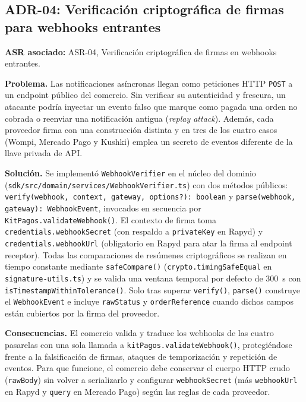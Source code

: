 \subsection{ADR-04: Verificación criptográfica de firmas para webhooks entrantes}
\textbf{ASR asociado:} ASR-04, Verificación criptográfica de firmas en webhooks entrantes.

\textbf{Problema.} Las notificaciones asíncronas llegan como peticiones HTTP \texttt{POST} a un endpoint público del comercio. Sin verificar su autenticidad y frescura, un atacante podría inyectar un evento falso que marque como pagada una orden no cobrada o reenviar una notificación antigua (\textit{replay attack}). Además, cada proveedor firma con una construcción distinta y en tres de los cuatro casos (Wompi, Mercado Pago y Kushki) emplea un secreto de eventos diferente de la llave privada de API.

\textbf{Solución.} Se implementó \texttt{Webhook\allowbreak{}Verifier} en el núcleo del dominio (\texttt{sdk/\allowbreak{}src/\allowbreak{}domain/\allowbreak{}services/\allowbreak{}Webhook\allowbreak{}Verifier.ts}) con dos métodos públicos: \texttt{verify(\allowbreak{}webhook, context, gateway, options?): boolean} y \texttt{parse(\allowbreak{}webhook, gateway): WebhookEvent}, invocados en secuencia por \texttt{KitPagos.\allowbreak{}validate\allowbreak{}Webhook()}. El contexto de firma toma \texttt{credentials.\allowbreak{}webhookSecret} (con respaldo a \texttt{privateKey} en Rapyd) y \texttt{credentials.\allowbreak{}webhookUrl} (obligatorio en Rapyd para atar la firma al endpoint receptor). Todas las comparaciones de resúmenes criptográficos se realizan en tiempo constante mediante \texttt{safeCompare()} (\texttt{crypto.\allowbreak{}timing\allowbreak{}Safe\allowbreak{}Equal} en \texttt{signature-\allowbreak{}utils.ts}) y se valida una ventana temporal por defecto de 300~s con \texttt{is\allowbreak{}Timestamp\allowbreak{}Within\allowbreak{}Tolerance()}. Solo tras superar \texttt{verify()}, \texttt{parse()} construye el \texttt{WebhookEvent} e incluye \texttt{rawStatus} y \texttt{orderReference} cuando dichos campos están cubiertos por la firma del proveedor.

\textbf{Consecuencias.} El comercio valida y traduce los webhooks de las cuatro pasarelas con una sola llamada a \texttt{kitPagos.validateWebhook()}, protegiéndose frente a la falsificación de firmas, ataques de temporización y repetición de eventos. Para que funcione, el comercio debe conservar el cuerpo HTTP crudo (\texttt{rawBody}) sin volver a serializarlo y configurar \texttt{webhookSecret} (más \texttt{webhookUrl} en Rapyd y \texttt{query} en Mercado Pago) según las reglas de cada proveedor.

